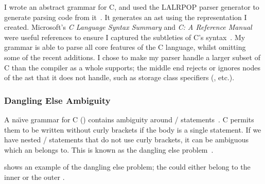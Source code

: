 \documentclass[00-main.tex]{subfiles}
\begin{document}
I wrote an abstract grammar for C, and used the LALRPOP parser generator to generate parsing code from it~.
It generates an \gls{ast} using the representation I created.
Microsoft's \emph{C Language Syntax Summary} and \emph{C: A Reference Manual} were useful references to ensure I captured the subtleties of C's syntax~. %
My grammar is able to parse all core features of the C language, whilst omitting some of the recent additions.
I chose to make my parser handle a larger subset of C than the compiler as a whole supports; the middle end rejects or ignores nodes of the \gls{ast} that it does not handle, such as storage class specifiers (, etc.).

\subsubsection{Dangling Else Ambiguity}

A na\"{\i}ve grammar for C () contains ambiguity around / statements~.
C permits them to be written without curly brackets if the body is a single statement.
If we have nested / statements that do not use curly brackets, it can be ambiguous which  an  belongs to. This is known as the dangling else problem~.

 shows an example of the dangling else problem; the  could either belong to the inner or the outer .
\end{document}
